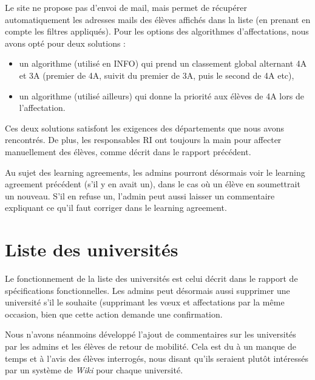 Le site ne propose pas d'envoi de mail, mais permet de récupérer automatiquement les adresses mails des élèves affichés dans la liste (en prenant en compte les filtres appliqués).
\bigbreak
Pour les options des algorithmes d'affectations, nous avons opté pour deux solutions :
\begin{itemize}
	\item un algorithme (utilisé en INFO) qui prend un classement global alternant 4A et 3A (premier de 4A, suivit du premier de 3A, puis le second de 4A etc),
	\item un algorithme (utilisé ailleurs) qui donne la priorité aux élèves de 4A lors de l'affectation.
\end{itemize}

Ces deux solutions satisfont les exigences des départements que nous avons rencontrés. De plus, les responsables RI ont toujours la main pour affecter manuellement des élèves, comme décrit dans le rapport précédent.

Au sujet des learning agreements, les admins pourront désormais voir le learning agreement précédent (s'il y en avait un), dans le cas où un élève en soumettrait un nouveau. S'il en refuse un, l'admin peut aussi laisser un commentaire expliquant ce qu'il faut corriger dans le learning agreement.

\section{Liste des universités}
Le fonctionnement de la liste des universités est celui décrit dans le rapport de spécifications fonctionnelles. Les admins peut désormais aussi supprimer une université s'il le souhaite (supprimant les vœux et affectations par la même occasion, bien que cette action demande une confirmation.

Nous n'avons néanmoins développé l'ajout de commentaires sur les universités par les admins et les élèves de retour de mobilité. Cela est du à un manque de temps et à l'avis des élèves interrogés, nous disant qu'ils seraient plutôt intéressés par un système de \textit{Wiki} pour chaque université.